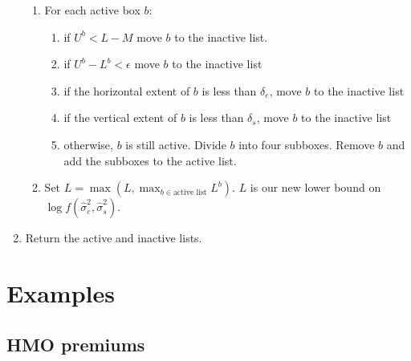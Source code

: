 \documentclass{report}
\newcommand{\RL}{f}
\newcommand{\logRL}{\log\RL}
\newcommand{\sshat}{\hat\sigma^2_e,\hat\sigma^2_s}
\begin{document}
\begin{enumerate}
	\begin{enumerate}
	\item For each active box $b$:
		\begin{enumerate}
		\item if $U^b < L-M$ move $b$ to the inactive list.
		\item if $U^b - L^b < \epsilon$ move $b$ to the inactive list
		\item if the horizontal extent of $b$ is less than $\delta_e$,
			move $b$ to the inactive list
		\item if the vertical extent of $b$ is less than $\delta_s$,
			move $b$ to the inactive list
		\item otherwise, $b$ is still active.  Divide $b$ into four subboxes.
			Remove $b$ and add the subboxes to the active list.
		\end{enumerate}
	\item Set $L = \max ( L, \max_{b\in \text{active list}}L^b )$.  $L$ is our new
		lower bound on $\logRL(\sshat)$.
	\end{enumerate}
\item Return the active and inactive lists.
\end{enumerate}

\section{Examples}

\subsection{HMO premiums}
\end{document}
